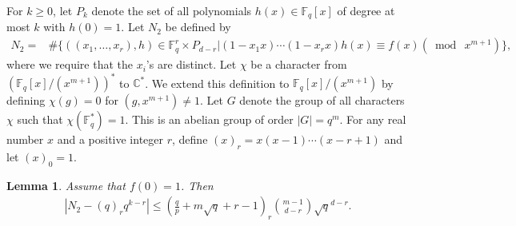 \documentclass[reqno]{amsart}
\newtheorem{lem}[thm]{Lemma}
\theoremstyle{remark}
\numberwithin{equation}{section}
\newcommand{\f}{\mathbb{F}_q}
\begin{document}
 For $k\geq 0$, let $P_k$ denote the set
of all polynomials $h(x) \in \f [x]$ of degree at most $k$ with $h(0)=1$.
Let $N_2$ be defined by
\begin{align*}
N_2=&\#\{((x_1,  \dots, x_r), h) \in \f^r \times P_{d-r} \big | (1-x_1x)\cdots(1-x_r x)h(x)\equiv f(x)(\bmod \ x^{m+1})\},
 \end{align*}
 where we require that the $x_i$'s are distinct.
 Let $\chi$ be a character from $(\f[x]/(x^{m+1}))^*$ to $\mathbb{C}^*$.
 We extend this definition to $\f[x]/(x^{m+1})$ by defining $\chi(g)=0$ for $(g, x^{m+1})\ne 1$.
 Let $G$ denote the group of all characters $\chi$ such that $\chi(\f^*)=1$. This is an abelian group of order $|G|=q^m$.
For any real number $x$ and a positive integer $r$, define $(x)_r=x(x-1)\cdots(x-r+1)$ and let $(x)_0=1$.



 \begin{lem}\label{lem3.5} Assume that $f(0)=1$.
Then       \begin{align*}
\left| N_2-(q)_r q^{k-r} \right| \leq  (\frac {q}p+m\sqrt{q}+r-1)_r{m-1 \choose d-r} \sqrt{q}^{d-r}.
 \end{align*}
 \end{lem}
\end{document}
